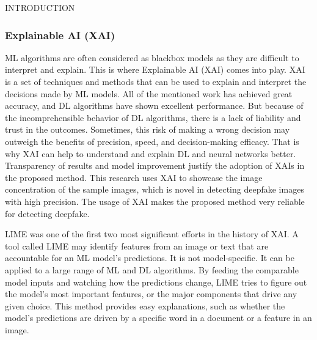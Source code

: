 \begin{section}[]{\uppercase{Introduction}}
    \subsubsection{Explainable AI (XAI)}
    ML algorithms are often considered as blackbox models as they are difficult to interpret and explain. This is where Explainable AI (XAI) comes into play. XAI is a set of techniques and methods that can be used to explain and interpret the decisions made by ML models. \cite{IBMExplainableAI}
    All of the mentioned work has achieved great accuracy, and DL algorithms have shown excellent
    performance. But because of the incomprehensible behavior of DL algorithms, there is a lack of liability
    and trust in the outcomes. Sometimes, this risk of making a wrong decision may outweigh the benefits of
    precision, speed, and decision-making efficacy. That is why XAI can help to understand and explain DL
    and neural networks better. Transparency of results and model improvement justify the adoption of XAIs
    in the proposed method.
    This research uses XAI to showcase the image concentration of the sample images, which is novel in
    detecting deepfake images with high precision. The usage of XAI makes the proposed method very
    reliable for detecting deepfake.
    \par LIME \cite{Ribeiro2016} was one of the first two most significant efforts in the
    history of XAI. A tool called LIME may identify features from an image or text that are accountable for
    an ML model’s predictions. It is not model-specific. It can be applied to a large range of ML and DL
    algorithms. By feeding the comparable model inputs and watching how the predictions change, LIME
    tries to figure out the model’s most important features, or the major components that drive any given
    choice. This method provides easy explanations, such as whether the model’s predictions are driven by a
    specific word in a document or a feature in an image.


\end{section}
